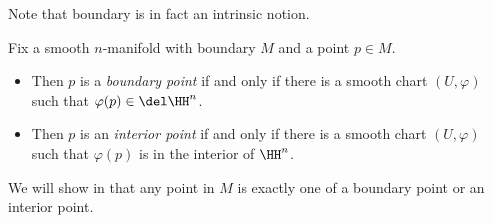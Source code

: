 \documentclass[../notes.tex]{subfiles}
\begin{document}
Note that boundary is in fact an intrinsic notion.
\begin{defihelper}  
	Fix a smooth $n$-manifold with boundary $M$ and a point $p\in M$.
	\begin{itemize}
		\item Then $p$ is a \textit{boundary point} if and only if there is a smooth chart $(U,\varphi)$ such that $\varphi(p)\in\del\HH^n$.
		\item Then $p$ is an \textit{interior point} if and only if there is a smooth chart $(U,\varphi)$ such that $\varphi(p)$ is in the interior of $\HH^n$.
	\end{itemize}
\end{defihelper}
We will show in  that any point in $M$ is exactly one of a boundary point or an interior point.
\end{document}
